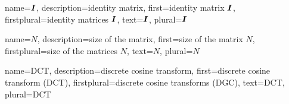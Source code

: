 {%
  name={$\boldsymbol{I}$},%
  description={identity matrix},%
  first={identity matrix $\boldsymbol{I}$},%
  firstplural={identity matrices $\boldsymbol{I}$},%
  text={$\boldsymbol{I}$},%
  plural={$\boldsymbol{I}$}%
}

{%
  name={$N$},%
  description={size of the matrix},%
  first={size of the matrix $N$},%
  firstplural={size of the matrices $N$},%
  text={$N$},%
  plural={$N$}%
}

{%
  name={DCT},%
  description={discrete cosine transform},%
  first={discrete cosine transform (DCT)},%
  firstplural={discrete cosine transforms (DGC)},%
  text={DCT},%
  plural={DCT}%
}